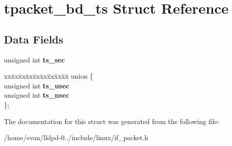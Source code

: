 \section{tpacket\-\_\-bd\-\_\-ts \-Struct \-Reference}
\label{structtpacket__bd__ts}
\subsection*{\-Data \-Fields}
\begin{DoxyCompactItemize}
\item 
unsigned int {\bfseries ts\-\_\-sec}\label{structtpacket__bd__ts_a0bfde5a638817566b9f067521d1c5ce6}

\item 
\begin{tabbing}
xx\=xx\=xx\=xx\=xx\=xx\=xx\=xx\=xx\=\kill
union \{\\
\>unsigned int {\bfseries ts\_usec}\\
\>unsigned int {\bfseries ts\_nsec}\\
\}; \label{structtpacket__bd__ts_a5256d4381d5b421f8dc0145461952b08}
\\

\end{tabbing}\end{DoxyCompactItemize}


\-The documentation for this struct was generated from the following file\-:\begin{DoxyCompactItemize}
\item 
/home/evan/lldpd-\/0../include/linux/if\-\_\-packet.\-h\end{DoxyCompactItemize}
